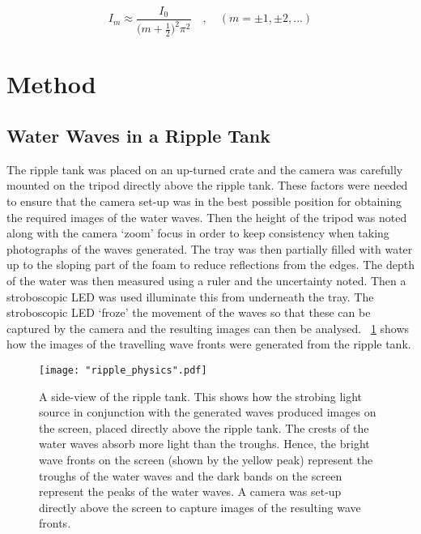 \documentclass{article}
\newcommand{\figref}[2][\figurename~]{#1\ref{#2}}
\begin{document}
\vspace{2mm}
\noindent
\begin{equation}
\label{eq:max_intensity}
I_m \approx \frac{I_0}{\big(m + \frac{1}{2}\big)^2\pi^2} \quad,\quad(m =  \pm1, \pm2, ...)
\end{equation}


\section{Method}
\label{sec:method}

\subsection{Water Waves in a Ripple Tank}
\label{ssec:ripple-method}

\vspace{2mm}
\noindent
The ripple tank was placed on an up-turned crate and the camera was carefully mounted on the tripod directly above the ripple tank. These factors were needed to ensure that the camera set-up was in the best possible position for obtaining the required images of the water waves. Then the height of the tripod was noted along with the camera `zoom' focus in order to keep consistency when taking photographs of the waves generated. The tray was then partially filled with water up to the sloping part of the foam \cite{Paper01} to reduce reflections from the edges. The depth of the water was then measured using a ruler and the uncertainty noted. Then a stroboscopic LED was used illuminate this from underneath the tray. The stroboscopic LED `froze' the movement of the waves so that these can be captured by the camera and the resulting images can then be analysed. \figref{fig:ripple_setup} shows how the images of the travelling wave fronts were generated from the ripple tank.

\begin{figure}[h]
\centering
\texttt{[image: "ripple\_physics".pdf]}
\caption{A side-view of the ripple tank. This shows how the strobing light source in conjunction with the generated waves produced images on the screen, placed directly above the ripple tank. The crests of the water waves absorb more light than the troughs. Hence, the bright wave fronts on the screen (shown by the yellow peak) represent the troughs of the water waves and the dark bands on the screen represent the peaks of the water waves.  A camera was  set-up directly above the screen to capture images of the resulting wave fronts.}
\label{fig:ripple_setup}
\end{figure}
\end{document}
